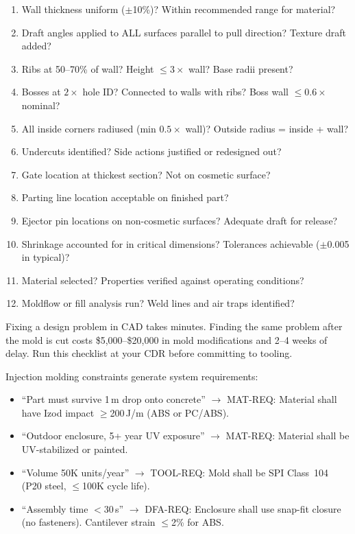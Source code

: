 \begin{enumerate}[leftmargin=1.5em]
  \item Wall thickness uniform ($\pm$10\%)? Within recommended range for material?
  \item Draft angles applied to ALL surfaces parallel to pull direction? Texture draft added?
  \item Ribs at 50--70\% of wall? Height $\leq 3\times$ wall? Base radii present?
  \item Bosses at $2\times$ hole ID? Connected to walls with ribs? Boss wall $\leq 0.6\times$ nominal?
  \item All inside corners radiused (min $0.5\times$ wall)? Outside radius = inside + wall?
  \item Undercuts identified? Side actions justified or redesigned out?
  \item Gate location at thickest section? Not on cosmetic surface?
  \item Parting line location acceptable on finished part?
  \item Ejector pin locations on non-cosmetic surfaces? Adequate draft for release?
  \item Shrinkage accounted for in critical dimensions? Tolerances achievable ($\pm$0.005\,in typical)?
  \item Material selected? Properties verified against operating conditions?
  \item Moldflow or fill analysis run? Weld lines and air traps identified?
\end{enumerate}

\begin{warningbox}
Fixing a design problem in CAD takes minutes. Finding the same problem after the mold is cut costs \$5,000--\$20,000 in mold modifications and 2--4 weeks of delay. Run this checklist at your CDR before committing to tooling.
\end{warningbox}

\begin{keyconceptbox}
Injection molding constraints generate system requirements:
\begin{itemize}[nosep,leftmargin=1.5em]
\item ``Part must survive 1\,m drop onto concrete'' $\to$ MAT-REQ: Material shall have Izod impact $\geq$200\,J/m (ABS or PC/ABS).
\item ``Outdoor enclosure, 5+ year UV exposure'' $\to$ MAT-REQ: Material shall be UV-stabilized or painted.
\item ``Volume 50K units/year'' $\to$ TOOL-REQ: Mold shall be SPI Class~104 (P20 steel, $\leq$100K cycle life).
\item ``Assembly time $<$30\,s'' $\to$ DFA-REQ: Enclosure shall use snap-fit closure (no fasteners). Cantilever strain $\leq$2\% for ABS.
\end{itemize}
\end{keyconceptbox}


